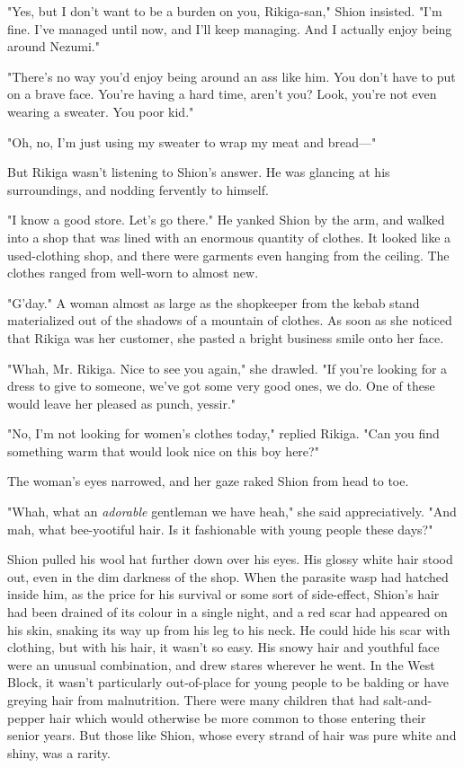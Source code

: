 "Yes, but I don't want to be a burden on you, Rikiga-san," Shion
insisted. "I'm fine. I've managed until now, and I'll keep managing. And
I actually enjoy being around Nezumi."

"There's no way you'd enjoy being around an ass like him. You don't have
to put on a brave face. You're having a hard time, aren't you? Look,
you're not even wearing a sweater. You poor kid."

"Oh, no, I'm just using my sweater to wrap my meat and bread---"

But Rikiga wasn't listening to Shion's answer. He was glancing at his
surroundings, and nodding fervently to himself.

"I know a good store. Let's go there." He yanked Shion by the arm, and
walked into a shop that was lined with an enormous quantity of clothes.
It looked like a used-clothing shop, and there were garments even
hanging from the ceiling. The clothes ranged from well-worn to almost
new.

"G'day." A woman almost as large as the shopkeeper from the kebab stand
materialized out of the shadows of a mountain of clothes. As soon as she
noticed that Rikiga was her customer, she pasted a bright business smile
onto her face.

"Whah, Mr. Rikiga. Nice to see you again," she drawled. "If you're
looking for a dress to give to someone, we've got some very good ones,
we do. One of these would leave her pleased as punch, yessir."

"No, I'm not looking for women's clothes today," replied Rikiga. "Can
you find something warm that would look nice on this boy here?"

The woman's eyes narrowed, and her gaze raked Shion from head to toe.

"Whah, what an \emph{adorable} gentleman we have heah," she said
appreciatively. "And mah, what bee-yootiful hair. Is it fashionable with
young people these days?"

Shion pulled his wool hat further down over his eyes. His glossy white
hair stood out, even in the dim darkness of the shop. When the parasite
wasp had hatched inside him, as the price for his survival or some sort
of side-effect, Shion's hair had been drained of its colour in a single
night, and a red scar had appeared on his skin, snaking its way up from
his leg to his neck. He could hide his scar with clothing, but with his
hair, it wasn't so easy. His snowy hair and youthful face were an
unusual combination, and drew stares wherever he went. In the West
Block, it wasn't particularly out-of-place for young people to be
balding or have greying hair from malnutrition. There were many children
that had salt-and-pepper hair which would otherwise be more common to
those entering their senior years. But those like Shion, whose every
strand of hair was pure white and shiny, was a rarity.

